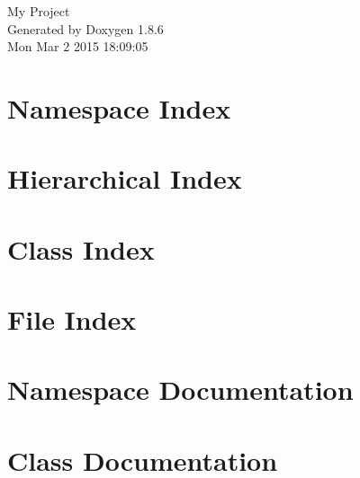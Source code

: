 \documentclass[twoside]{book}
\newcommand{\clearemptydoublepage}{%
  \newpage{\pagestyle{empty}\cleardoublepage}%
}
\begin{document}
\hypersetup{pageanchor=false}
\begin{titlepage}
\vspace*{7cm}
\begin{center}%
{\Large My Project }\\
\vspace*{1cm}
{\large Generated by Doxygen 1.8.6}\\
\vspace*{0.5cm}
{\small Mon Mar 2 2015 18:09:05}\\
\end{center}
\end{titlepage}
\clearemptydoublepage
\tableofcontents
\clearemptydoublepage
{}
\hypersetup{pageanchor=true}

\chapter{Namespace Index}

\chapter{Hierarchical Index}

\chapter{Class Index}

\chapter{File Index}

\chapter{Namespace Documentation}

\chapter{Class Documentation}









































\end{document}
